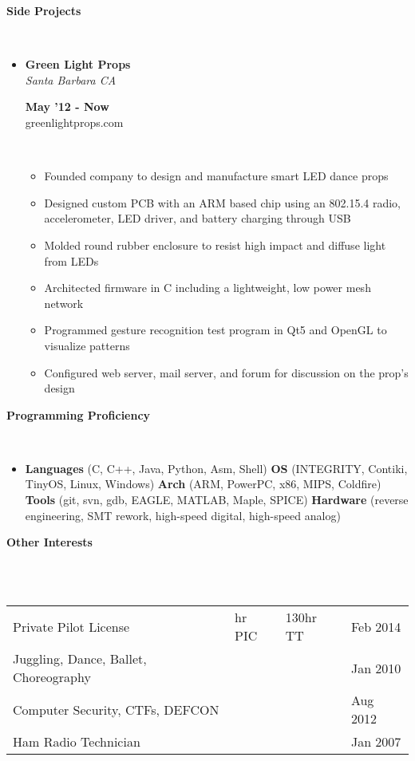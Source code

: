 \documentclass[a4paper,11pt]{article}
\newcommand{\lsep}{-0.2cm}
\newcommand{\resheading}[1]{{\small \colorbox{mygrey}{\begin{minipage}{0.975\textwidth}{\textbf{#1 \vphantom{p\^{E}}}}\end{minipage}}}}
\newcommand{\workexp}[4]{
\begin{minipage}[t]{7cm}
\begin{flushleft}
\textbf{#1} \\
\indent \emph{#2}\\
\end{flushleft}
\end{minipage}
\hfill
\begin{minipage}[t]{7cm}
\begin{flushright}
\textbf{#3} \\
\indent #4 \\
\end{flushright}
\end{minipage}
}
\begin{document}

\resheading{\textbf{Side Projects}}\\[\lsep]

\begin{itemize}
\item \workexp{Green Light Props}{Santa Barbara CA}{May '12 - Now}{greenlightprops.com}
\\[-0.2cm]
	\begin{itemize}
	\item Founded company to design and manufacture smart LED dance props
	\item Designed custom PCB with an ARM based chip using an 802.15.4 radio, accelerometer, LED driver, and battery charging through USB
	\item Molded round rubber enclosure to resist high impact and diffuse light from LEDs
	\item Architected firmware in C including a lightweight, low power mesh network
	\item Programmed gesture recognition test program in Qt5 and OpenGL to visualize patterns
	\item Configured web server, mail server, and forum for discussion on the prop's design
	\end{itemize}
\end{itemize}



\resheading{\textbf{Programming Proficiency} }\\[\lsep]
\begin{itemize}
\item \noindent \textbf{Languages} (C, C++, Java, Python, Asm, Shell)  
\textbf{OS} (INTEGRITY, Contiki, TinyOS, Linux, Windows) 
\textbf{Arch} (ARM, PowerPC, x86, MIPS, Coldfire) 
\textbf{Tools} (git, svn, gdb, EAGLE, MATLAB, Maple, SPICE) 
\textbf{Hardware} (reverse engineering, SMT rework, high-speed digital, high-speed analog)
\end{itemize} 



\resheading{\textbf{Other Interests} }\\[\lsep]
\\[0.2cm]
\indent \begin{tabular}{   l  l  l  l } 
\indent Private Pilot License & \indent 40 hr PIC & \indent 130hr TT  \indent & \indent Feb 2014\\
\indent Juggling, Dance, Ballet, Choreography \indent \indent \indent & \indent    & \indent  & \indent Jan 2010 \\
\indent Computer Security, CTFs, DEFCON & \indent  & \indent  & \indent Aug 2012\\
\indent Ham Radio Technician & \indent  & \indent  & \indent Jan 2007\\
\end{tabular}



\end{document}
